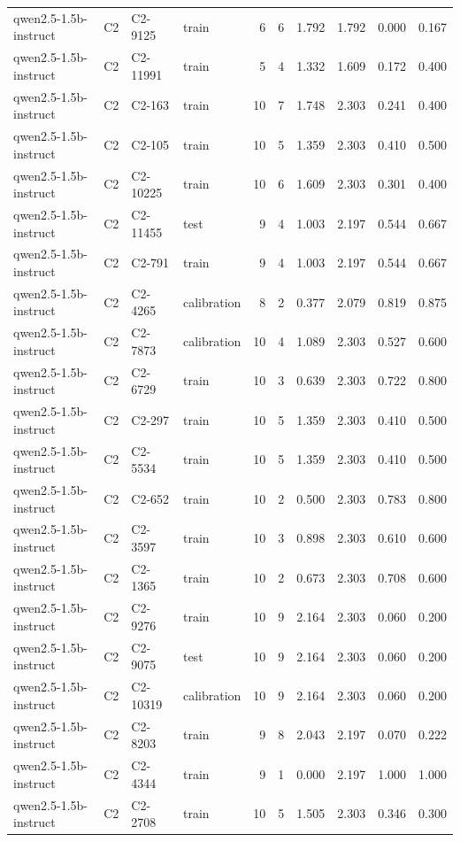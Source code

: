 \begin{table}
\begin{tabular}{llllrrrrrr}
qwen2.5-1.5b-instruct & C2 & C2-9125 & train & 6 & 6 & 1.792 & 1.792 & 0.000 & 0.167 \\
qwen2.5-1.5b-instruct & C2 & C2-11991 & train & 5 & 4 & 1.332 & 1.609 & 0.172 & 0.400 \\
qwen2.5-1.5b-instruct & C2 & C2-163 & train & 10 & 7 & 1.748 & 2.303 & 0.241 & 0.400 \\
qwen2.5-1.5b-instruct & C2 & C2-105 & train & 10 & 5 & 1.359 & 2.303 & 0.410 & 0.500 \\
qwen2.5-1.5b-instruct & C2 & C2-10225 & train & 10 & 6 & 1.609 & 2.303 & 0.301 & 0.400 \\
qwen2.5-1.5b-instruct & C2 & C2-11455 & test & 9 & 4 & 1.003 & 2.197 & 0.544 & 0.667 \\
qwen2.5-1.5b-instruct & C2 & C2-791 & train & 9 & 4 & 1.003 & 2.197 & 0.544 & 0.667 \\
qwen2.5-1.5b-instruct & C2 & C2-4265 & calibration & 8 & 2 & 0.377 & 2.079 & 0.819 & 0.875 \\
qwen2.5-1.5b-instruct & C2 & C2-7873 & calibration & 10 & 4 & 1.089 & 2.303 & 0.527 & 0.600 \\
qwen2.5-1.5b-instruct & C2 & C2-6729 & train & 10 & 3 & 0.639 & 2.303 & 0.722 & 0.800 \\
qwen2.5-1.5b-instruct & C2 & C2-297 & train & 10 & 5 & 1.359 & 2.303 & 0.410 & 0.500 \\
qwen2.5-1.5b-instruct & C2 & C2-5534 & train & 10 & 5 & 1.359 & 2.303 & 0.410 & 0.500 \\
qwen2.5-1.5b-instruct & C2 & C2-652 & train & 10 & 2 & 0.500 & 2.303 & 0.783 & 0.800 \\
qwen2.5-1.5b-instruct & C2 & C2-3597 & train & 10 & 3 & 0.898 & 2.303 & 0.610 & 0.600 \\
qwen2.5-1.5b-instruct & C2 & C2-1365 & train & 10 & 2 & 0.673 & 2.303 & 0.708 & 0.600 \\
qwen2.5-1.5b-instruct & C2 & C2-9276 & train & 10 & 9 & 2.164 & 2.303 & 0.060 & 0.200 \\
qwen2.5-1.5b-instruct & C2 & C2-9075 & test & 10 & 9 & 2.164 & 2.303 & 0.060 & 0.200 \\
qwen2.5-1.5b-instruct & C2 & C2-10319 & calibration & 10 & 9 & 2.164 & 2.303 & 0.060 & 0.200 \\
qwen2.5-1.5b-instruct & C2 & C2-8203 & train & 9 & 8 & 2.043 & 2.197 & 0.070 & 0.222 \\
qwen2.5-1.5b-instruct & C2 & C2-4344 & train & 9 & 1 & 0.000 & 2.197 & 1.000 & 1.000 \\
qwen2.5-1.5b-instruct & C2 & C2-2708 & train & 10 & 5 & 1.505 & 2.303 & 0.346 & 0.300 \\

\end{tabular}
\end{table}

